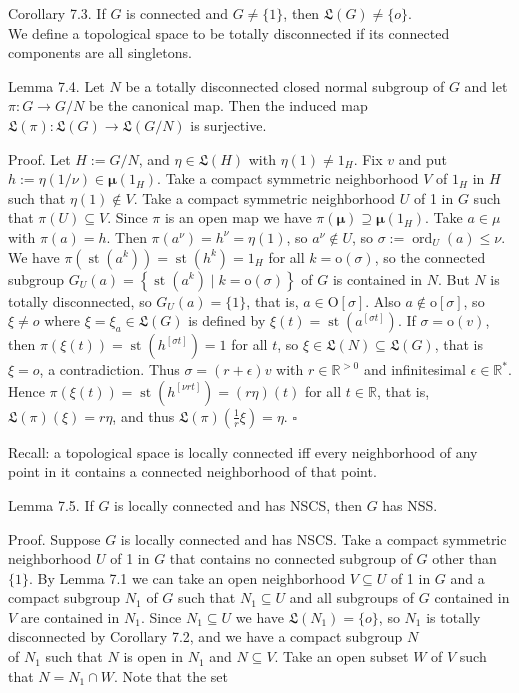 \documentclass[10pt]{article}
\begin{document}
Corollary 7.3. If $G$ is connected and $G \neq\{1\}$, then $\mathfrak{L}(G) \neq\{o\}$.\\
We define a topological space to be totally disconnected if its connected components are all singletons.

Lemma 7.4. Let $N$ be a totally disconnected closed normal subgroup of $G$ and let $\pi: G \rightarrow G / N$ be the canonical map. Then the induced map $\mathfrak{L}(\pi): \mathfrak{L}(G) \rightarrow \mathfrak{L}(G / N)$ is surjective.

Proof. Let $H:=G / N$, and $\eta \in \mathfrak{L}(H)$ with $\eta(1) \neq 1_{H}$. Fix $v$ and put $h:=\eta(1 / \nu) \in \boldsymbol{\mu}\left(1_{H}\right)$. Take a compact symmetric neighborhood $V$ of $1_{H}$ in $H$ such that $\eta(1) \notin V$. Take a compact symmetric neighborhood $U$ of 1 in $G$ such that $\pi(U) \subseteq V$. Since $\pi$ is an open map we have $\pi(\boldsymbol{\mu}) \supseteq \boldsymbol{\mu}\left(1_{H}\right)$. Take $a \in \mu$ with $\pi(a)=h$. Then $\pi\left(a^{\nu}\right)=h^{\nu}=\eta(1)$, so $a^{\nu} \notin U$, so $\sigma:=\operatorname{ord}_{U}(a) \leq \nu$. We have $\pi\left(\operatorname{st}\left(a^{k}\right)\right)=\operatorname{st}\left(h^{k}\right)=1_{H}$ for all $k=\mathrm{o}(\sigma)$, so the connected subgroup $G_{U}(a)=\left\{\operatorname{st}\left(a^{k}\right) \mid k=\mathrm{o}(\sigma)\right\}$ of $G$ is contained in $N$. But $N$ is totally disconnected, so $G_{U}(a)=\{1\}$, that is, $a \in \mathrm{O}[\sigma]$. Also $a \notin \mathrm{o}[\sigma]$, so $\xi \neq o$ where $\xi=\xi_{a} \in \mathfrak{L}(G)$ is defined by $\xi(t)=\operatorname{st}\left(a^{[\sigma t]}\right)$. If $\sigma=\mathrm{o}(v)$, then $\pi(\xi(t))=\operatorname{st}\left(h^{[\sigma t]}\right)=1$ for all $t$, so $\xi \in \mathfrak{L}(N) \subseteq \mathfrak{L}(G)$, that is $\xi=o$, a contradiction. Thus $\sigma=(r+\epsilon) v$ with $r \in \mathbb{R}^{>0}$ and infinitesimal $\epsilon \in \mathbb{R}^{*}$. Hence $\pi(\xi(t))=\operatorname{st}\left(h^{[\nu r t]}\right)=(r \eta)(t)$ for all $t \in \mathbb{R}$, that is, $\mathfrak{L}(\pi)(\xi)=r \eta$, and thus $\mathfrak{L}(\pi)\left(\frac{1}{r} \xi\right)=\eta$. \(\square\)

Recall: a topological space is locally connected iff every neighborhood of any point in it contains a connected neighborhood of that point.

Lemma 7.5. If $G$ is locally connected and has NSCS, then $G$ has NSS.

Proof. Suppose $G$ is locally connected and has NSCS. Take a compact symmetric neighborhood $U$ of 1 in $G$ that contains no connected subgroup of $G$ other than $\{1\}$. By Lemma 7.1 we can take an open neighborhood $V \subseteq U$ of 1 in $G$ and a compact subgroup $N_{1}$ of $G$ such that $N_{1} \subseteq U$ and all subgroups of $G$ contained in $V$ are contained in $N_{1}$. Since $N_{1} \subseteq U$ we have $\mathfrak{L}\left(N_{1}\right)=\{o\}$, so $N_{1}$ is totally disconnected by Corollary 7.2, and we have a compact subgroup $N$\\
of $N_{1}$ such that $N$ is open in $N_{1}$ and $N \subseteq V$. Take an open subset $W$ of $V$ such that $N=N_{1} \cap W$. Note that the set
\end{document}
